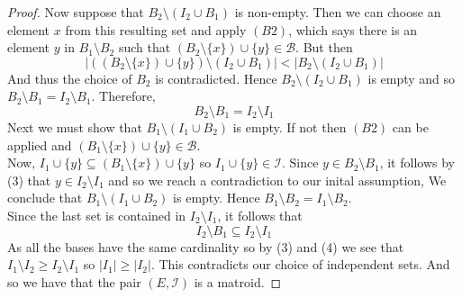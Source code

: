\documentclass[../main.tex]{subfiles}
\begin{document}
\begin{proof}
Now suppose that $B_2 \setminus (I_2 \cup B_1)$ is non-empty. Then we can choose an element $x$ from this resulting set and apply $(B2)$, which says there is an element $y$ in $B_1 \setminus B_2$ such that $(B_2 \setminus \{x\}) \cup \{y\} \in \mathcal{B}.$ But then\\
\begin{equation}
|((B_2 \setminus \{x\}) \cup \{y\}) \setminus (I_2 \cup B_1)| < |B_2 \setminus (I_2 \cup B_1)|
\end{equation}
\noindent And thus the choice of $B_2$ is contradicted. Hence $B_2 \setminus (I_2 \cup B_1)$ is empty and so $B_2 \setminus B_1 = I_2 \setminus B_1.$ Therefore,
\begin{equation}
B_2 \setminus B_1 = I_2 \setminus I_1
\end{equation}
\noindent Next we must show that $B_1 \setminus (I_1 \cup B_2)$ is empty. If not then $(B2)$ can be applied and $(B_1 \setminus \{x\}) \cup \{y\} \in \mathcal{B}.$\\
Now, $I_1 \cup \{y\} \subseteq  (B_1 \setminus \{x\}) \cup \{y\}$ so $I_1 \cup \{y\} \in \mathcal{I}.$ Since $y \in B_2 \setminus B_1$, it follows by (3) that $y \in I_2 \setminus I_1$ and so we reach a contradiction to our inital assumption, We conclude that $B_1 \setminus (I_1 \cup B_2)$ is empty. Hence $B_1 \setminus B_2 = I_1 \setminus B_2.$\\
Since the last set is contained in $ I_2 \setminus I_1$, it follows that
\begin{equation}
I_2 \setminus B_1 \subseteq I_2 \setminus I_1
\end{equation}
As all the bases have the same cardinality so by (3) and (4) we see that\\ $I_1 \setminus I_2 \geq I_2 \setminus I_1$ so $|I_1| \geq |I_2|.$ This contradicts our choice of independent sets. And so we have that the pair $(E,\mathcal{I})$ is a matroid.
\end{proof}
\end{document}
